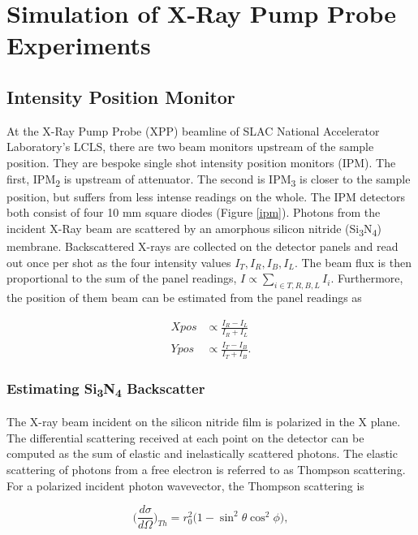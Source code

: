 \documentclass{report}
\begin{document}
\chapter{Simulation of X-Ray Pump Probe Experiments}

\section{Intensity Position Monitor}
At the X-Ray Pump Probe (XPP) beamline of SLAC National Accelerator Laboratory's LCLS, there are two beam monitors upstream of the sample position.
They are bespoke single shot intensity position monitors (IPM).
The first, IPM\textsubscript{2} is upstream of attenuator.
The second is IPM\textsubscript{3} is closer to the sample position, but suffers from less intense readings on the whole.
The IPM detectors both consist of four 10 mm square diodes (Figure \ref{ipm}).
Photons from the incident X-Ray beam are scattered by an amorphous silicon nitride (Si\textsubscript{3}N\textsubscript{4}) membrane.
Backscattered X-rays are collected on the detector panels and read out once per shot as the four intensity values $I_T, I_R, I_B, I_L$. 
The beam flux is then proportional to the sum of the panel readings, $I\propto \sum_{i\in T,R,B,L}I_i$. 
Furthermore, the position of them beam can be estimated from the panel readings as 

\begin{equation}\label{eq:position}
\begin{aligned}
Xpos &\propto \frac{I_R-I_L} {I_R + I_L} \\
Ypos &\propto \frac{I_T-I_B} {I_T + I_B}.
\end{aligned}
\end{equation}

\subsection{Estimating Si\textsubscript{3}N\textsubscript{4} Backscatter}
The X-ray beam incident on the silicon nitride film is polarized in the X plane. 
The differential scattering received at each point on the detector can be computed as the sum of elastic and inelastically scattered photons. 
The elastic scattering of photons from a free electron is referred to as Thompson scattering. 
For a polarized incident photon wavevector, the Thompson scattering is \cite{Hubbell1975-fl}

\begin{equation}
\bigg( \frac {d\sigma}{d\Omega} \bigg)_{Th} = r_0^2 \bigg(1 - \sin^2 \theta \cos^2 \phi \bigg),
\end{equation}
\end{document}
